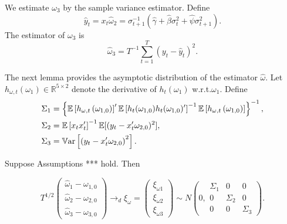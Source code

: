 \documentclass[11pt, letterpaper, twoside]{article}
\begin{document}
We estimate $\omega_{3}$ by the sample variance estimator. Define 
%
\begin{equation}
    \widehat{y}_{t} = x_{t}\widehat{\omega}_{2} = \sigma_{t+1}^{-1}(\widehat{\gamma}+\widehat{\beta}\sigma_{t}^{2}+\widehat{\psi}\sigma_{t+1}^{2}).
\end{equation}
%
The estimator of $\omega_{3}$ is 
%
\begin{equation}
    \widehat{\omega}_{3} = T^{-1}\sum_{t=1}^{T} \left(y_{t}-\widehat{y}_{t}\right)^{2}.
\end{equation}%

The next lemma provides the asymptotic distribution of the estimator $\widehat{\omega}$. Let $h_{\omega ,t}(\omega_{1})\in \mathbb{R}^{5\times 2}$ denote the derivative of $h_{t}(\omega_{1})$ w.r.t.\@ $\omega_{1}$. Define 
%
\begin{align}
    \Sigma_{1} & = \left \{ \E\left[ h_{\omega ,t}\left( \omega _{1,0}\right) \right]^{\prime} \E\left[h_{t}(\omega_{1,0})h_{t}(\omega _{1,0})^{\prime}\right]^{-1} \E\left[ h_{\omega,t}\left(\omega_{1,0}\right)
    \right] \right \} ^{-1}, \nonumber \\ 
%
    \Sigma_{2} & = \E\left[ x_{t}x_{t}^{\prime}\right] ^{-1}\mathbb{E[(} y_{t}-x_{t}^{\prime }\omega_{2,0})^{2}], \\
%
    \Sigma_{3} & = \Var\left[\left( y_{t}-x_{t}^{\prime}\omega_{2,0}\right)^{2}\right]. \nonumber 
\end{align}

\begin{lemma}
Suppose Assumptions *** hold. Then

\begin{equation}
 T^{1/2}\left( 
%
 \begin{array}{c}
  \widehat{\omega}_{1}-\omega_{1,0} \\ 
  \widehat{\omega}_{2}-\omega_{2,0} \\ 
  \widehat{\omega}_{3}-\omega_{3,0}%
 \end{array}\right) 
%
 \rightarrow_{d}\xi_{\omega} = 
%
 \left(\begin{array}{c}
   \xi_{\omega 1} \\ 
   \xi_{\omega 2} \\ 
   \xi_{\omega 3}%
 \end{array}\right) 
%
 \sim N\left( 0,
%
 \begin{array}{ccc}
  \Sigma_{1} & 0 & 0 \\ 
  0 & \Sigma_{2} & 0 \\ 
  0 & 0 & \Sigma_{3}%
 \end{array}\right).
\end{equation}
\end{lemma}
\end{document}
